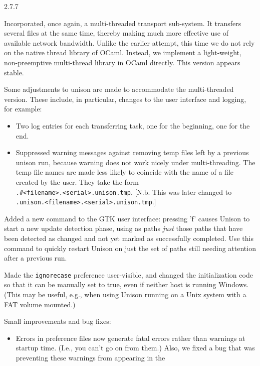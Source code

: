 \begin{changesfromversion}{2.7.7}
\item Incorporated, once again, a multi-threaded transport sub-system.
  It transfers several files at the same time, thereby making much
  more effective use of available network bandwidth.  Unlike the
  earlier attempt, this time we do not rely on the native thread
  library of OCaml.  Instead, we implement a light-weight,
  non-preemptive multi-thread library in OCaml directly.  This version
  appears stable.

  Some adjustments to unison are made to accommodate the multi-threaded
  version.  These include, in particular, changes to the
  user interface and logging, for example:
  \begin{itemize}
  \item Two log entries for each transferring task, one for the
    beginning, one for the end.
  \item Suppressed warning messages against removing temp files left
    by a previous unison run, because warning does not work nicely
    under multi-threading.  The temp file names are made less likely
    to coincide with the name of a file created by the user.  They
    take the form \\ \verb|.#<filename>.<serial>.unison.tmp|.
    [N.b. This was later changed to \verb|.unison.<filename>.<serial>.unison.tmp|.]
  \end{itemize}
\item Added a new command to the GTK user interface: pressing 'f' causes
  Unison to start a new update detection phase, using as paths {\em just}
  those paths that have been detected as changed and not yet marked as
  successfully completed.  Use this command to quickly restart Unison on
  just the set of paths still needing attention after a previous run.
\item Made the {\tt ignorecase} preference user-visible, and changed the
  initialization code so that it can be manually set to true, even if
  neither host is running Windows.  (This may be useful, e.g., when using
  Unison running on a Unix system with a FAT volume mounted.)
\item Small improvements and bug fixes:
  \begin{itemize}
  \item Errors in preference files now generate fatal errors rather than
    warnings at startup time.  (I.e., you can't go on from them.)  Also,
    we fixed a bug that was preventing these warnings from appearing in the

\end{itemize}
\end{changesfromversion}
